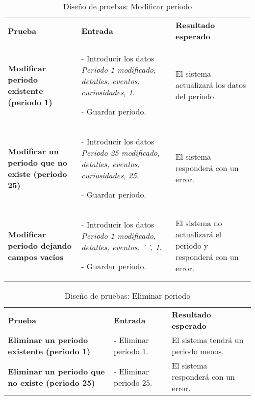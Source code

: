 \begin{table}[H]
\vspace{-4mm}
  \centering
  \caption{Diseño de pruebas: Modificar periodo}
    \begin{tabular}{p{10em}p{13em}p{14em}}
    \toprule
    \rowcolor[rgb]{ .851,  .886,  .953} \multicolumn{3}{p{36em}}{\textbf{Modificar periodo}} \\ \midrule
    \rowcolor[rgb]{ .949,  .949,  .949} \textbf{Prueba} & \textbf{Entrada} & \textbf{Resultado esperado}\\ \midrule
    \textbf{Modificar periodo existente (periodo 1)} & - Introducir los datos \textit{Periodo 1 modificado, detalles, eventos, curiosidades, 1}.\par - Guardar periodo. & El sistema actualizará los datos del periodo. \\ \midrule
    \textbf{Modificar un periodo que no existe (periodo 25)} & - Introducir los datos \textit{Periodo 25 modificado, detalles, eventos, curiosidades, 25}.\par - Guardar periodo. & El sistema responderá con un error. \\ \midrule
    \textbf{Modificar periodo dejando campos vacíos} & - Introducir los datos \textit{Periodo 1 modificado, detalles, eventos, ' ', 1}.\par - Guardar periodo. & El sistema no actualizará el periodo y responderá con un error. \\ \bottomrule
    \end{tabular}%
\end{table}%
\begin{table}[H]
\vspace{-4mm}
  \centering
  \caption{Diseño de pruebas: Eliminar periodo}
    \begin{tabular}{p{11em}p{11em}p{14em}}
    \toprule
    \rowcolor[rgb]{ .851,  .886,  .953} \multicolumn{3}{p{36em}}{\textbf{Eliminar periodo}} \\ \midrule
    \rowcolor[rgb]{ .949,  .949,  .949} \textbf{Prueba} & \textbf{Entrada} & \textbf{Resultado esperado}\\ \midrule
    \textbf{Eliminar un periodo existente (periodo 1)} & - Eliminar periodo 1.  & El sistema tendrá un periodo menos. \\ \midrule
    \textbf{Eliminar un periodo que no existe (periodo 25)} & - Eliminar periodo 25.  & El sistema responderá con un error. \\ \bottomrule
    \end{tabular}%
\end{table}%

